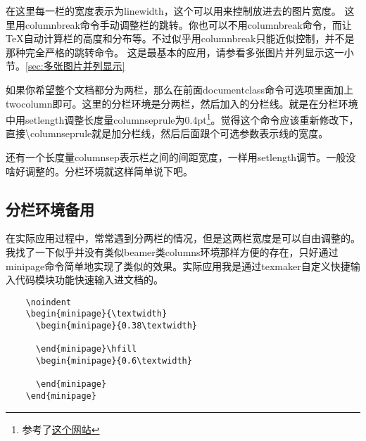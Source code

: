 \documentclass[11pt,oneside]{book}
\begin{document}
  在这里每一栏的宽度表示为linewidth，这个可以用来控制放进去的图片宽度。
  这里用columnbreak命令手动调整栏的跳转。你也可以不用columnbreak命令，而让\TeX 自动计算栏的高度和分布等。不过似乎用columnbreak只能近似控制，并不是那种完全严格的跳转命令。
  这是最基本的应用，请参看多张图片并列显示这一小节。\ref{sec:多张图片并列显示}



  \begin{multicols}{2}
    \setlength{\columnseprule}{0.4pt}
    如果你希望整个文档都分为两栏，那么在前面documentclass命令可选项里面加上twocolumn即可。这里的分栏环境是分两栏，然后加入的分栏线。就是在分栏环境中用setlength调整长度量columnseprule为0.4pt\footnote{参考了\href{http://texblog.org/tag/columnseprule/}{这个网站}}。觉得这个命令应该重新修改下，直接\textbackslash columnseprule就是加分栏线，然后后面跟个可选参数表示线的宽度。

    还有一个长度量columnsep表示栏之间的间距宽度，一样用setlength调节。一般没啥好调整的。分栏环境就这样简单说下吧。
  \end{multicols}


  \subsection{分栏环境备用}
  在实际应用过程中，常常遇到分两栏的情况，但是这两栏宽度是可以自由调整的。我找了一下似乎并没有类似beamer类columns环境那样方便的存在，只好通过minipage命令简单地实现了类似的效果。实际应用我是通过texmaker自定义快捷输入代码模块功能快速输入进文档的。
  \begin{Verbatim}
    \noindent
    \begin{minipage}{\textwidth}
      \begin{minipage}{0.38\textwidth}

      \end{minipage}\hfill
      \begin{minipage}{0.6\textwidth}

      \end{minipage}
    \end{minipage}
  \end{Verbatim}
\end{document}
